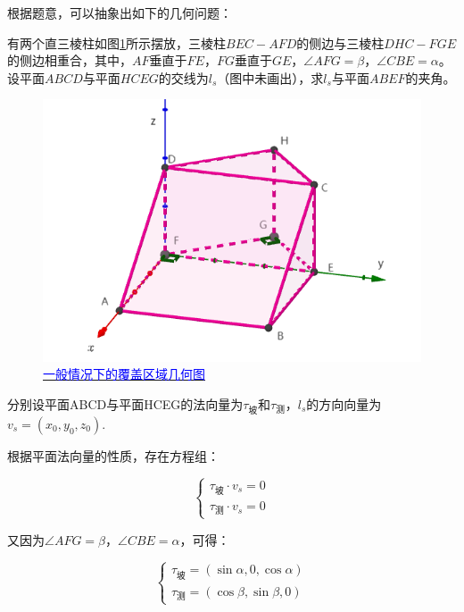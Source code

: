

根据题意，可以抽象出如下的几何问题：

有两个直三棱柱如图\ref{fig:一般情况下的覆盖区域几何图}所示摆放，三棱柱$BEC-AFD$的侧边与三棱柱$DHC-FGE$的侧边相重合，其中，$AF$垂直于$FE$，$FG$垂直于$GE$，$\angle AFG=\beta$，$\angle CBE=\alpha$。设平面$ABCD$与平面$HCEG$的交线为$l_s$（图中未画出），求$l_s$与平面$ABEF$的夹角。

\begin{figure}[h]
    \centering
    \includegraphics[scale=0.4]{res/img/一般情况下的覆盖区域几何图.png}
    \caption{\href{https://www.geogebra.org/m/absuxwpk}{\textcolor{blue}{一般情况下的覆盖区域几何图}}}
    \label{fig:一般情况下的覆盖区域几何图}
\end{figure}

分别设平面ABCD与平面HCEG的法向量为$\tau_\text{坡}$和$\tau_\text{测}$，$l_s$的方向向量为$v_s = (x_0, y_0, z_0)$.

根据平面法向量的性质，存在方程组：

\begin{equation}
    \begin{cases}
        \tau_\text{坡} \cdot v_s = 0 \\
        \tau_\text{测} \cdot v_s = 0
    \end{cases}
\end{equation}

又因为$\angle AFG=\beta$，$\angle CBE=\alpha$，可得：

\begin{equation}
    \begin{cases}
        \tau_\text{坡} = (\sin\alpha, 0, \cos\alpha) \\
        \tau_\text{测} = (\cos\beta, \sin\beta, 0)
    \end{cases}
\end{equation}

